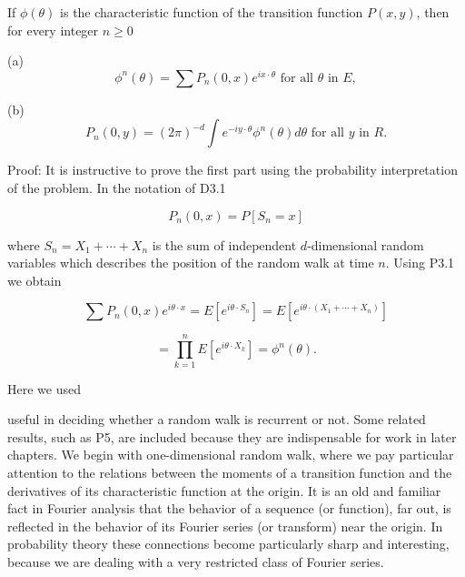 If $\phi(\theta)$ is the characteristic function of the transition function $P(x,y)$, then for every integer $n \geq 0$

(a) $$\phi^n(\theta) = \sum P_n(0,x)e^{ix \cdot \theta} \text{ for all } \theta \text{ in } E,$$

(b) $$P_n(0,y) = (2\pi)^{-d} \int e^{-iy \cdot \theta} \phi^n(\theta) d\theta \text{ for all } y \text{ in } R.$$

Proof: It is instructive to prove the first part using the probability interpretation of the problem. In the notation of D3.1

$$P_n(0,x) = P[S_n = x]$$

where $S_n = X_1 + \cdots + X_n$ is the sum of independent $d$-dimensional random variables which describes the position of the random walk at time $n$. Using P3.1 we obtain

$$\sum P_n(0,x)e^{i\theta \cdot x} = E[e^{i\theta \cdot S_n}] = E[e^{i\theta \cdot (X_1 + \cdots + X_n)}]$$

$$= \prod_{k=1}^{n} E[e^{i\theta \cdot X_k}] = \phi^n(\theta).$$

Here we used

useful in deciding whether a random walk is recurrent or not. Some related results, such as P5, are included because they are indispensable for work in later chapters. We begin with one-dimensional random walk, where we pay particular attention to the relations between the moments of a transition function and the derivatives of its characteristic function at the origin. It is an old and familiar fact in Fourier analysis that the behavior of a sequence (or function), far out, is reflected in the behavior of its Fourier series (or transform) near the origin. In probability theory these connections become particularly sharp and interesting, because we are dealing with a very restricted class of Fourier series.